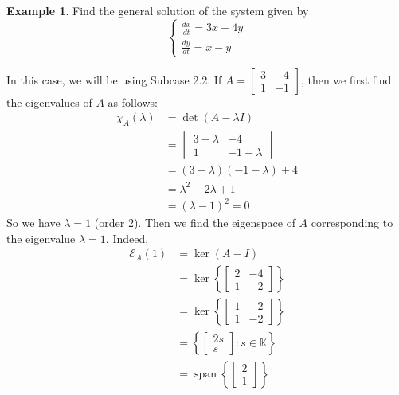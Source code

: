 \documentclass[11pt]{book}
\theoremstyle{definition}\newtheorem{definition}[subsection]{Definition}
\theoremstyle{definition}\newtheorem{example}[subsection]{Example}
\theoremstyle{definition}\newtheorem{notation}[subsection]{Notation}
\theoremstyle{definition}\newtheorem{remark}[subsection]{Remark}
\theoremstyle{theorem}\newtheorem{theorem}[subsection]{Theorem}
\theoremstyle{theorem}\newtheorem{lemma}[subsection]{Lemma}
\theoremstyle{theorem}\newtheorem{proposition}[subsection]{Proposition}
\theoremstyle{theorem}\newtheorem{corollary}[subsection]{Corollary}
\theoremstyle{theorem}\newtheorem{case}{Case}
\theoremstyle{remark}\newtheorem{subcase}{Subcase}[case]
\newcommand{\K}{\mathbb{K}}
\newcommand{\E}{\mathcal{E}}
\DeclareMathOperator{\Span}{span}
\begin{document}
\begin{example}\label{example:1.2.5}
    Find the general solution of the system given by
    \begin{equation*}
        \begin{cases}
            \frac{dx}{dt} = 3x - 4y \\
            \frac{dy}{dt} = x - y
        \end{cases}
    \end{equation*}
\end{example}

In this case, we will be using Subcase 2.2. If $A = \begin{bmatrix} 3 & -4 \\ 1 & -1 \end{bmatrix}$, then we first find the eigenvalues of $A$ as follows:
\begin{align*}
    \chi_A(\lambda) &= \det(A - \lambda I) \\
    &= \begin{vmatrix} 3 - \lambda & -4 \\ 1 & -1 - \lambda \end{vmatrix} \\
    &= (3 - \lambda)(-1 - \lambda) + 4 \\
    &= \lambda^2 - 2\lambda + 1 \\
    &= (\lambda - 1)^2 = 0
\end{align*}
So we have $\lambda = 1$ (order 2). Then we find the eigenspace of $A$ corresponding to the eigenvalue $\lambda = 1$. Indeed,
\begin{align*}
    \E_A(1) &= \ker(A - I) \\
    &= \ker\left\{\begin{bmatrix} 2 & -4 \\ 1 & -2 \end{bmatrix}\right\} \\
    &= \ker\left\{\begin{bmatrix} 1 & -2 \\ 1 & -2 \end{bmatrix}\right\} \\
    &= \left\{\begin{bmatrix} 2s \\ s \end{bmatrix} : s \in \K\right\} \\
    &= \Span\left\{\begin{bmatrix} 2 \\ 1 \end{bmatrix}\right\}
\end{align*}
\end{document}
